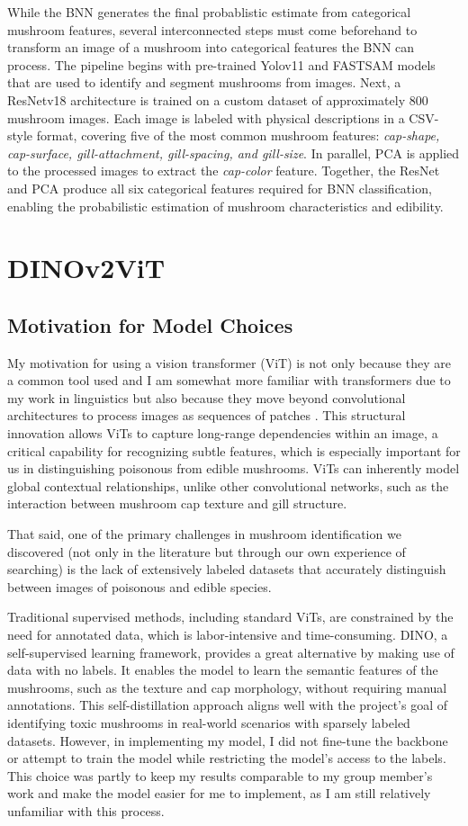 \documentclass[journal]{IEEEtran}
\begin{document}
While the BNN generates the final probablistic estimate from categorical mushroom features, several interconnected steps must come beforehand to transform an image of a mushroom into categorical features the BNN can process. The pipeline begins with  pre-trained Yolov11 and FASTSAM models that are used to identify and segment mushrooms from images. Next, a ResNetv18 architecture is trained on a custom dataset of approximately 800 mushroom images. Each image is labeled with physical descriptions in a CSV-style format, covering five of the most common mushroom features: \textit{ cap-shape, cap-surface, gill-attachment, gill-spacing, and gill-size}. In parallel, PCA is applied to the processed images to extract the \textit{cap-color} feature. Together, the ResNet and PCA produce all six categorical features required for BNN classification, enabling the probabilistic estimation of mushroom characteristics and edibility.


\section{DINOv2ViT}
\subsection{Motivation for Model Choices}
My motivation for using a vision transformer (ViT) is not only because they are a common tool used and I am somewhat more familiar with transformers due to my work in linguistics but also because they move beyond convolutional architectures to process images as sequences of patches \cite{ViT}. This structural innovation allows ViTs to capture long-range dependencies within an image, a critical capability for recognizing subtle features, which is especially important for us in distinguishing poisonous from edible mushrooms. ViTs can inherently model global contextual relationships, unlike other convolutional networks, such as the interaction between mushroom cap texture and gill structure.

That said, one of the primary challenges in mushroom identification we discovered (not only in the literature but through our own experience of searching) is the lack of extensively labeled datasets that accurately distinguish between images of poisonous and edible species. 

Traditional supervised methods, including standard ViTs, are constrained by the need for annotated data, which is labor-intensive and time-consuming. DINO, a self-supervised learning framework, provides a great alternative by making use of data with no labels. It enables the model to learn the semantic features of the mushrooms, such as the texture and cap morphology, without requiring manual annotations. This self-distillation approach aligns well with the project's goal of identifying toxic mushrooms in real-world scenarios with sparsely labeled datasets. However, in implementing my model, I did not fine-tune the backbone or attempt to train the model while restricting the model’s access to the labels. This choice was partly to keep my results comparable to my group member’s work and make the model easier for me to implement, as I am still relatively unfamiliar with this process.  
\end{document}
